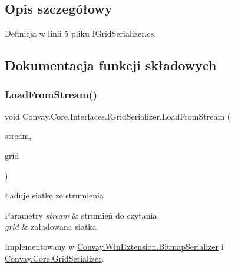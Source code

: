 \subsection{Opis szczegółowy}


Definicja w linii 5 pliku I\+Grid\+Serializer.\+cs.



\subsection{Dokumentacja funkcji składowych}
\hypertarget{interface_convay_1_1_core_1_1_interfaces_1_1_i_grid_serializer_ab6297bf5bb8f31e4ee4c27e4edfcd2bc}{}\label{interface_convay_1_1_core_1_1_interfaces_1_1_i_grid_serializer_ab6297bf5bb8f31e4ee4c27e4edfcd2bc} 
\subsubsection{\texorpdfstring{Load\+From\+Stream()}{LoadFromStream()}}
{\footnotesize\ttfamily void Convay.\+Core.\+Interfaces.\+I\+Grid\+Serializer.\+Load\+From\+Stream (\begin{DoxyParamCaption}\item[{Stream}]{stream,  }\item[{\hyperlink{interface_convay_1_1_core_1_1_interfaces_1_1_i_grid}{I\+Grid}}]{grid }\end{DoxyParamCaption})}



Ładuje siatkę ze strumienia 


\begin{DoxyParams}{Parametry}
{\em stream} & strumień do czytania\\
\hline
{\em grid} & załadowana siatka\\
\hline
\end{DoxyParams}


Implementowany w \hyperlink{class_convay_1_1_win_extension_1_1_bitmap_serializer_ab92b6c14cd7febe69f9dbc03cb3f2e3b}{Convay.\+Win\+Extension.\+Bitmap\+Serializer} i \hyperlink{class_convay_1_1_core_1_1_grid_serializer_a2df3c14a45db4c5d498cb26ccb3a1529}{Convay.\+Core.\+Grid\+Serializer}.

\hypertarget{interface_convay_1_1_core_1_1_interfaces_1_1_i_grid_serializer_ac8de4f85acd03d95f73a7c7f85db43b2}{}\label{interface_convay_1_1_core_1_1_interfaces_1_1_i_grid_serializer_ac8de4f85acd03d95f73a7c7f85db43b2} 
